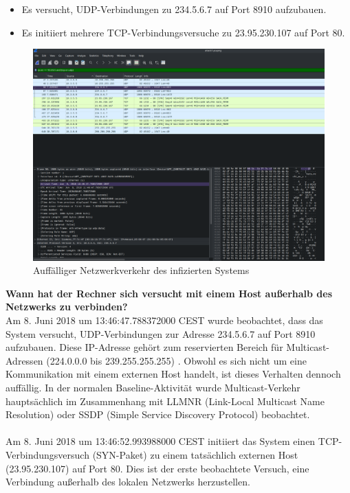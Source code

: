 \documentclass[
    a4paper,
    pagesize,
	pdftex,
    12pt,
]{scrartcl}
\begin{document}
\begin{itemize}
    \item Es versucht, UDP-Verbindungen zu 234.5.6.7 auf Port 8910 aufzubauen.
    \item Es initiiert mehrere TCP-Verbindungsversuche zu 23.95.230.107 auf Port 80.
\end{itemize}

\begin{figure}[H]
    \centering
    \includegraphics[width=\textwidth]{ws-suspicious-traffic.png}
    \caption{Auffälliger Netzwerkverkehr des infizierten Systems}
    \label{fig:ws-suspicious-traffic}
\end{figure}
\textbf{Wann hat der Rechner sich versucht mit einem Host außerhalb des Netzwerks zu verbinden?}
\\
Am 8. Juni 2018 um 13:46:47.788372000 CEST wurde beobachtet, dass das System versucht, UDP-Verbindungen zur Adresse 234.5.6.7 auf Port 8910 aufzubauen. Diese IP-Adresse gehört zum reservierten Bereich für Multicast-Adressen (224.0.0.0 bis 239.255.255.255) \cite{multicast-ip}. Obwohl es sich nicht um eine Kommunikation mit einem externen Host handelt, ist dieses Verhalten dennoch auffällig. In der normalen Baseline-Aktivität wurde Multicast-Verkehr hauptsächlich im Zusammenhang mit LLMNR (Link-Local Multicast Name Resolution) oder SSDP (Simple Service Discovery Protocol) beobachtet.
\\ \\
Am 8. Juni 2018 um 13:46:52.993988000 CEST initiiert das System einen TCP-Verbindungsversuch (SYN-Paket) zu einem tatsächlich externen Host (23.95.230.107) auf Port 80. Dies ist der erste beobachtete Versuch, eine Verbindung außerhalb des lokalen Netzwerks herzustellen.
\end{document}
